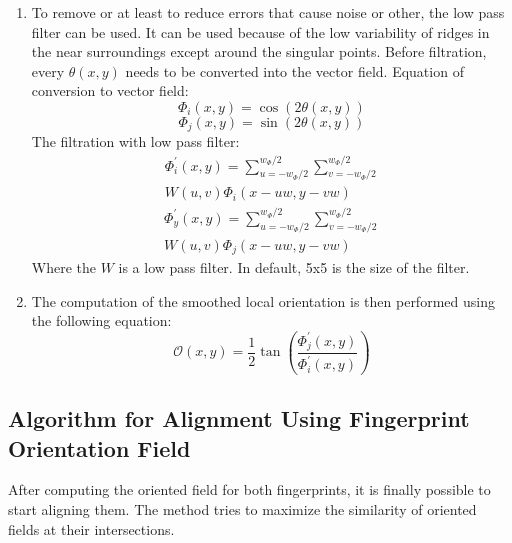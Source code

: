 \begin{enumerate}
	\item To remove or at least to reduce errors that cause noise or other, the low pass filter can be used. It can be used because of the low variability of ridges in the near surroundings except around the singular points. Before filtration, every $\theta(x, y)$ needs to be converted into the vector field. Equation of conversion to vector field: \cite{ori} \cite{orientation_field_2}
    \begin{equation}
         \Phi_{i}(x, y)=\cos (2 \theta(x, y))
    \end{equation}   
    \begin{equation}
         \Phi_{j}(x, y)=\sin (2 \theta(x, y))
     \end{equation}
     The filtration with low pass filter: \cite{ori}
     \begin{equation}
         \begin{split}
             \Phi_{i}^{\prime}(x, y)= \sum_{u=-w_{\Phi} / 2}^{w_{\Phi} / 2} \sum_{v=-w_{\Phi} / 2}^{w_{\Phi} / 2} \\ W(u, v) \Phi_{i}(x-u w, y-v w)
        \end{split}
     \end{equation}
     \begin{equation}
        \begin{split}
             \Phi_{y}^{\prime}(x, y)=\sum_{u=-w_{\Phi} / 2}^{w_{\Phi} / 2} \sum_{v=-w_{\Phi} / 2}^{w_{\Phi} / 2} \\ W(u, v) \Phi_{j}(x-u w, y-v w)
        \end{split}
     \end{equation}
	Where the $W$ is a low pass filter. In default, 5x5 is the size of the filter. \cite{orientation_field_2}
	
     \item 
     The computation of the smoothed local orientation is then performed using the following equation: \cite{ori} \cite{orientation_field_2}
      \begin{equation}
        \mathcal{O}(x, y)=\frac{1}{2} \tan \left(\frac{\Phi_{j}^{\prime}(x, y)}{\Phi_{i}^{\prime}(x, y)}\right)
     \end{equation}
\end{enumerate}

\subsection{Algorithm for Alignment Using Fingerprint Orientation Field}
After computing the oriented field for both fingerprints, it is finally possible to start aligning them. The method tries to maximize the similarity of oriented fields at their intersections.

